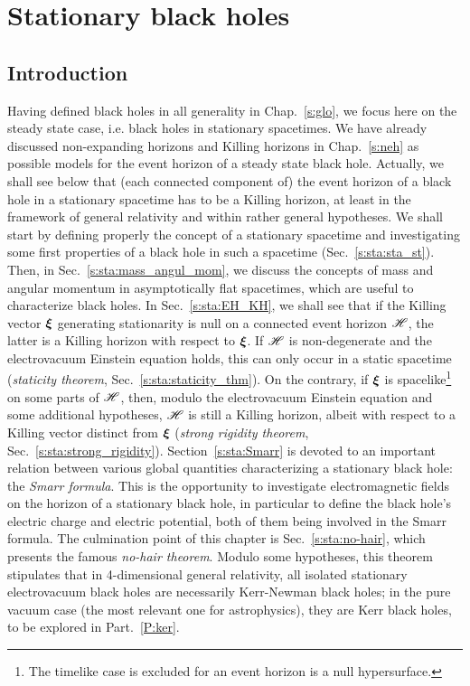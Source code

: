 \chapter{Stationary black holes}
\label{s:sta}

\minitoc

\section{Introduction}

Having defined black holes in all generality in Chap.~\ref{s:glo}, we focus
here on the steady state case, i.e. black holes in stationary spacetimes.
We have already discussed
non-expanding horizons and Killing horizons in Chap.~\ref{s:neh} as
possible models for the event horizon of a
steady state black hole. Actually, we shall see below that (each connected
component of) the event horizon of a black hole in a stationary spacetime has to be
a Killing horizon, at least in the framework of general relativity and within
rather general hypotheses.
We shall start by defining properly the concept of a stationary
spacetime and investigating some first properties of a black hole
in such a spacetime (Sec.~\ref{s:sta:sta_st}).
Then, in Sec.~\ref{s:sta:mass_angul_mom}, we discuss the concepts
of mass and angular momentum in asymptotically flat spacetimes, which are useful to characterize black holes. In Sec.~\ref{s:sta:EH_KH}, we shall
see that
if the Killing vector $\bm{\xi}$ generating stationarity is null on
a connected event horizon $\mathscr{H}$, the latter is a Killing horizon with
respect to $\bm{\xi}$.  If $\mathscr{H}$ is non-degenerate and the
electrovacuum Einstein equation holds, this can only occur in a static spacetime
(\emph{staticity theorem}, Sec.~\ref{s:sta:staticity_thm}).
On the contrary, if $\bm{\xi}$ is spacelike\footnote{The timelike
case is excluded for an event horizon is a null hypersurface.} on some parts of $\mathscr{H}$, then, modulo the
electrovacuum Einstein equation and some additional hypotheses,
$\mathscr{H}$ is still a Killing horizon, albeit with respect to a Killing vector
distinct from $\bm{\xi}$ (\emph{strong rigidity theorem}, Sec.~\ref{s:sta:strong_rigidity}).
Section~\ref{s:sta:Smarr} is devoted to an important relation between various global
quantities characterizing a stationary black hole: the \emph{Smarr formula}.
This is the opportunity to investigate electromagnetic
fields on the horizon of a stationary black hole, in particular to define
the black hole's electric charge and electric potential, both of them being involved
in the Smarr formula. The culmination point of this chapter is
Sec.~\ref{s:sta:no-hair}, which presents the famous
\emph{no-hair theorem}. Modulo some hypotheses, this theorem stipulates that in 4-dimensional
general relativity, all isolated stationary electrovacuum black holes are necessarily
Kerr-Newman black holes; in the pure vacuum case (the most relevant one for astrophysics),
they are Kerr black holes, to be explored in Part.~\ref{P:ker}.

